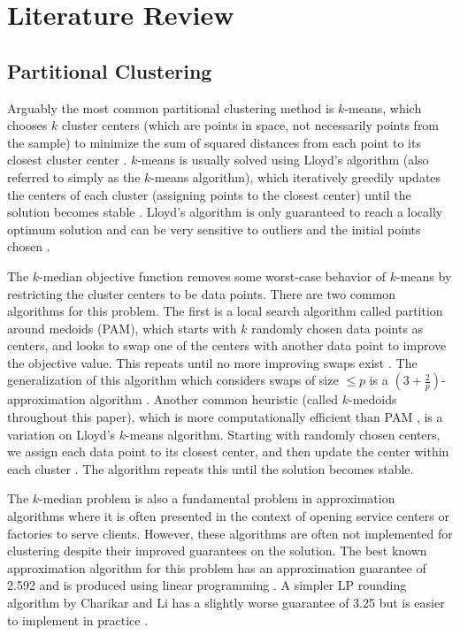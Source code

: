 \documentclass[conference, 10pt, final]{IEEEtran}
\begin{document}
\section{Literature Review}

\subsection{Partitional Clustering}
Arguably the most common partitional clustering method is $k$-means, which chooses $k$ cluster centers (which are points in space, not necessarily points from the sample) to minimize the sum of squared distances from each point to its closest cluster center \cite{Jain}.  $k$-means is usually solved using Lloyd's algorithm (also referred to simply as the $k$-means algorithm), which iteratively greedily updates the centers of each cluster (assigning points to the closest center) until the solution becomes stable \cite{Jain}. Lloyd's algorithm is only guaranteed to reach a locally optimum solution and can be very sensitive to outliers and the initial points chosen \cite{Kanungo}.

The $k$-median objective function removes some worst-case behavior of $k$-means by restricting the cluster centers to be data points.  There are two common algorithms for this problem. The first is a local search algorithm called partition around medoids (PAM), which starts with $k$ randomly chosen data points as centers, and looks to swap one of the centers with another data point to improve the objective value. This repeats until no more improving swaps exist \cite{ESL}. The generalization of this algorithm which considers swaps of size $\leq p$ is a $(3 + \frac{2}{p})$-approximation algorithm \cite{Arya}.
Another common heuristic (called $k$-medoids throughout this paper), which is more computationally efficient than PAM \cite{Park}, is a variation on Lloyd's $k$-means algorithm.  Starting with randomly chosen centers, we assign each data point to its closest center, and then update the center within each cluster \cite{Park}. The algorithm repeats this until the solution becomes stable.

The $k$-median problem is also a fundamental problem in approximation algorithms where it is often presented in the context of opening service centers or factories to serve clients. However, these algorithms are often not implemented for clustering despite their improved guarantees on the solution. The best known approximation algorithm for this problem has an approximation guarantee of 2.592 and is produced using linear programming \cite{Wu}. A simpler LP rounding algorithm by Charikar and Li has a slightly worse guarantee of 3.25 but is easier to implement in practice \cite{Charikar}. 
\end{document}
